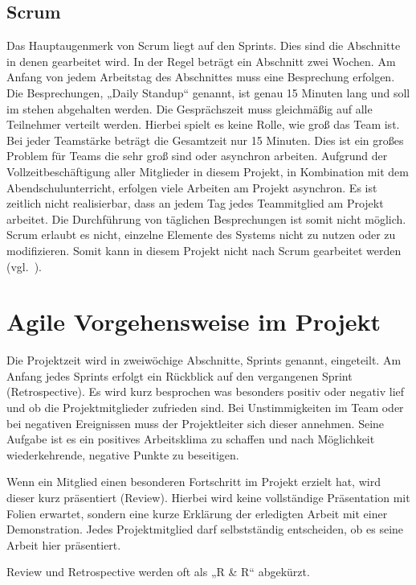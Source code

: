 {\subsection{Scrum}
Das Hauptaugenmerk von Scrum liegt auf den Sprints. Dies sind die Abschnitte in
denen gearbeitet wird. In der Regel beträgt ein Abschnitt zwei Wochen. Am
Anfang von jedem Arbeitstag des Abschnittes muss eine Besprechung erfolgen. Die
Besprechungen, „Daily Standup“ genannt, ist genau 15 Minuten lang und soll im
stehen abgehalten werden. Die Gesprächszeit muss gleichmäßig auf alle
Teilnehmer verteilt werden. Hierbei spielt es keine Rolle, wie groß das Team
ist. Bei jeder Teamstärke beträgt die Gesamtzeit nur 15 Minuten. Dies ist ein
großes Problem für Teams die sehr groß sind oder asynchron arbeiten. Aufgrund
der Vollzeitbeschäftigung aller Mitglieder in diesem Projekt, in Kombination
mit dem Abendschulunterricht, erfolgen viele Arbeiten am Projekt asynchron. Es
ist zeitlich nicht realisierbar, dass an jedem Tag jedes Teammitglied am
Projekt arbeitet. Die Durchführung von täglichen Besprechungen ist somit nicht
möglich. Scrum erlaubt es nicht, einzelne Elemente des Systems nicht zu nutzen
oder zu modifizieren. Somit kann in diesem Projekt nicht nach Scrum gearbeitet
werden (vgl.~\cite{scrum_talk}).
\tm%

\section{Agile Vorgehensweise im Projekt}
\label{sec:agile_vorgehensweise}
Die Projektzeit wird in zweiwöchige Abschnitte, Sprints genannt, eingeteilt. Am
Anfang jedes Sprints erfolgt ein Rückblick auf den vergangenen Sprint
(Retrospective). Es wird kurz besprochen was besonders positiv oder negativ
lief und ob die Projektmitglieder zufrieden sind. Bei Unstimmigkeiten im Team
oder bei negativen Ereignissen muss der Projektleiter sich dieser annehmen.
Seine Aufgabe ist es ein positives Arbeitsklima zu schaffen und nach
Möglichkeit wiederkehrende, negative Punkte zu beseitigen.

Wenn ein Mitglied einen besonderen Fortschritt im Projekt erzielt hat, wird
dieser kurz präsentiert (Review). Hierbei wird keine vollständige Präsentation
mit Folien erwartet, sondern eine kurze Erklärung der erledigten Arbeit mit
einer Demonstration. Jedes Projektmitglied darf selbstständig entscheiden, ob
es seine Arbeit hier präsentiert.

Review und Retrospective werden oft als „R \& R“ abgekürzt.

}
